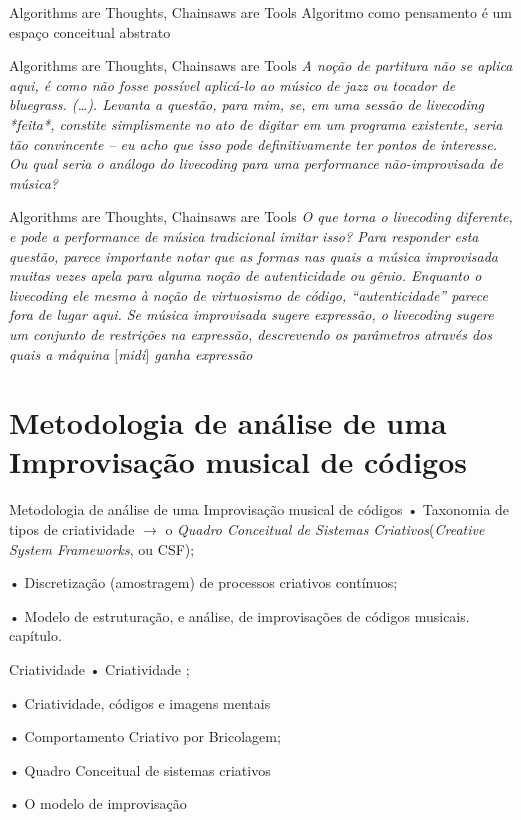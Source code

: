 \documentclass[aspectratio=169]{beamer}
\begin{document}
\begin{frame}{Algorithms are Thoughts, Chainsaws are Tools}
Algoritmo como pensamento é um espaço conceitual abstrato
\end{frame}

\begin{frame}{Algorithms are Thoughts, Chainsaws are Tools}
\emph{A noção de partitura não se aplica aqui, é como não fosse possível aplicá-lo ao músico de \emph{jazz} ou tocador de \emph{bluegrass}. (\ldots). Levanta a questão, para mim, se, em uma sessão de \emph{livecoding} *feita*, constite simplismente no ato de digitar em um programa existente, seria tão convincente -- eu acho que isso pode definitivamente ter pontos de interesse. Ou qual seria o análogo do \emph{livecoding} para uma performance não-improvisada de música?}
\end{frame}

\begin{frame}{Algorithms are Thoughts, Chainsaws are Tools}
\emph{O que torna o \emph{livecoding} diferente, e pode a performance de música tradicional imitar isso? Para responder esta questão, parece importante notar que as formas nas quais a música improvisada muitas vezes apela para alguma noção de autenticidade ou gênio. Enquanto o \emph{livecoding} ele mesmo à noção de virtuosismo de código, ``autenticidade'' parece fora de lugar aqui. Se música improvisada sugere expressão, o \emph{livecoding} sugere um conjunto de restrições na expressão, descrevendo os parâmetros através dos quais a máquina $[$midi$]$ ganha expressão}
\end{frame}

\section{Metodologia de análise de uma Improvisação musical de códigos}
\begin{frame}{Metodologia de análise de uma Improvisação musical de códigos}
• Taxonomia de tipos de criatividade $\rightarrow$ o \emph{Quadro Conceitual de Sistemas Criativos}(\emph{Creative System Frameworks}, ou CSF);

• Discretização (amostragem) de processos criativos contínuos;

• Modelo de estruturação, e análise, de improvisações de códigos musicais.
 capítulo.
 \end{frame}
 
 
\begin{frame}{Criatividade}
• Criatividade \cite{boden_creative_1990};

• Criatividade, códigos e imagens mentais \cite{McLean2011}

• Comportamento Criativo por Bricolagem;

• Quadro Conceitual de sistemas criativos

• O modelo de improvisação
\end{frame}
\end{document}
